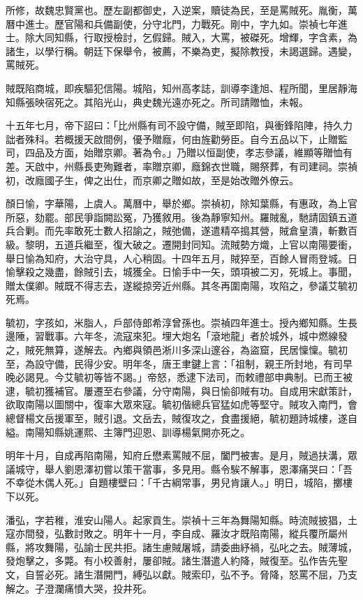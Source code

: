 \begin{pinyinscope}
所修，故魏忠賢黨也。歷左副都御史，入逆案，贖徒為民，至是罵賊死。胤衡，萬曆中進士。歷官陽和兵備副使，分守北門，力戰死。剛中，字九如。崇禎七年進士。除大同知縣，行取授檢討，乞假歸。賊入，大罵，被磔死。增輝，字含素，為諸生，以學行稱。朝廷下保舉令，被薦，不樂為吏，擬除教授，未謁選歸。遇變，罵賊死。

賊既陷商城，即疾驅犯信陽。城陷，知州高孝誌，訓導李逢旭、程所聞，里居靜海知縣張映宿死之。其陷光山，典史魏光遠亦死之。所司請贈恤，未報。

十五年七月，帝下詔曰：「比州縣有司不設守備，賊至即陷，與衝鋒陷陣，持久力詘者殊科。若概援天啟間例，優予贈廕，何由旌勸勞臣。自今五品以下，止贈監司，四品及方面，始贈京卿。著為令。」乃贈以恒副使，孝志參議，維顯等贈恤有差。天啟中，州縣長吏殉難者，率贈京卿，廕錦衣世職，賜祭葬，有司建祠。崇禎初，改廕國子生，俾之出仕，而京卿之贈如故，至是始改贈外僚云。

顏日愉，字華陽，上虞人。萬曆中，舉於鄉。崇禎初，除知葉縣，有惠政，為上官所惡，劾罷。部民爭詣闕訟冤，乃獲敘用。後為靜寧知州。羅賊亂，馳請固鎮五道兵合剿。而先率敢死士數人招諭之，賊弛備，遂遣精卒搗其營，賊倉皇潰，斬數百級。黎明，五道兵繼至，復大破之。遷開封同知。流賊勢方熾，上官以南陽要衝，舉日愉為知府，大治守具，人心稍固。十四年五月，賊猝至，百餘人冒雨登城。日愉擊殺之幾盡，餘賊引去，城獲全。日愉手中一矢，頭項被二刃，死城上。事聞，贈太僕卿。賊既不得志去，遂縱掠旁近州縣。其冬再圍南陽，攻陷之，參議艾毓初死焉。

毓初，字孩如，米脂人，戶部侍郎希淳曾孫也。崇禎四年進士。授內鄉知縣。生長邊陲，習戰事。六年冬，流寇來犯。埋大炮名「滾地龍」者於城外，城中燃線發之，賊死無算，遂解去。內鄉與領邑淅川多深山邃谷，為盜窟，民居懍懍。毓初至，為設守備，民得少安。明年冬，唐王聿鍵上言：「祖制，親王所封地，有司早晚必謁見。今艾毓初等皆不謁。」帝怒，悉逮下法司，而敕禮部申典制。已而王被逮，毓初獲補官。屢遷至右參議，分守南陽，與日愉卻賊有功。自成用宋獻策計，欲取南陽以圖關中，復率大眾來寇。毓初偕總兵官猛如虎等堅守。賊攻入南門，會總督楊文岳援軍至，賊引退。文岳去，賊復攻之，食盡援絕，毓初題詩城樓，遂自縊。南陽知縣姚運熙、主簿門迎恩、訓導楊氣開亦死之。

明年十月，自成再陷南陽，知府丘懋素罵賊不屈，闔門被害。是月，賊過扶溝，眾議城守，舉人劉恩澤初嘗以策干當事，多見用。縣令騃不解事，恩澤痛哭曰：「吾不幸從木偶人死。」自題樓壁曰：「千古綱常事，男兒肯讓人。」明日，城陷，擲樓下以死。

潘弘，字若稚，淮安山陽人。起家貢生。崇禎十三年為舞陽知縣。時流賊披猖，土寇亦間發，弘數討敗之。明年十一月，李自成、羅汝才既陷南陽，縱兵覆所屬州縣，將攻舞陽，弘諭士民共拒。諸生慮賊屠城，請委曲紓禍，弘叱之去。賊薄城，發炮擊之，多斃。有小校善射，屢卻賊。諸生潛遣人約降，賊復至。弘作告先聖文，自誓必死。諸生潛開門，縛弘以獻。賊索印，弘不予。脅降，怒罵不屈，乃支解之。子澄瀾痛憤大哭，投井死。


\end{pinyinscope}
